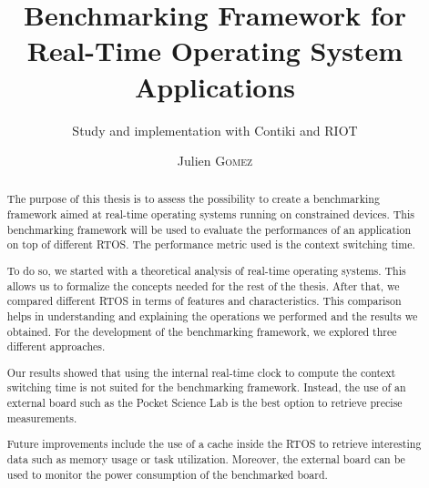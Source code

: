 \documentclass{EPL-master-thesis-covers-EN}
\title{Benchmarking Framework for Real-Time Operating System Applications}
\subtitle{Study and implementation with Contiki and RIOT}
\author{Julien \textsc{Gomez}}
\begin{document}
  \maketitle

\cleardoublepage
{}

 \begin{abstract}

    The purpose of this thesis is to assess the possibility to create a benchmarking framework aimed at 
      real-time operating systems running on constrained devices. 
    This benchmarking framework will be used to evaluate the performances of an application on top of different RTOS.
    The performance metric used is the context switching time.

    To do so, we started with a theoretical analysis of real-time operating systems.
    This allows us to formalize the concepts needed for the rest of the thesis.
    After that, we compared different RTOS in terms of features and characteristics.
    This comparison helps in understanding and explaining the operations we performed and the results we obtained.
    For the development of the benchmarking framework, we explored three different approaches.
    
    Our results showed that using the internal real-time clock to compute the context switching time is not suited for the benchmarking framework.
    Instead, the use of an external board such as the Pocket Science Lab is the best option to retrieve precise measurements.

    Future improvements include the use of a cache inside the RTOS to retrieve interesting data such as memory usage or task utilization.
    Moreover, the external board can be used to monitor the power consumption of the benchmarked board.
    
 \end{abstract}
\end{document}
